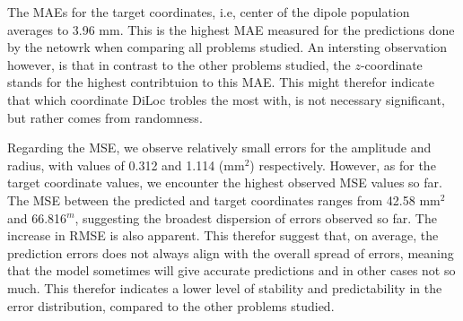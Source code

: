 \documentclass[a4paper, UKenglish, 11pt]{uiomaster}
\begin{document}
The MAEs for the target coordinates, i.e, center of the dipole population averages to 3.96 mm. This is the highest MAE measured for the predictions done by the netowrk when comparing all problems studied. An intersting observation however, is that in contrast to the other problems studied, the $z$-coordinate stands for the highest contribtuion to this MAE. This might therefor indicate that which coordinate DiLoc trobles the most with, is not necessary significant, but rather comes from randomness.

Regarding the MSE, we observe relatively small errors for the amplitude and radius, with values of 0.312 and 1.114 (mm$^2$) respectively. However, as for the target coordinate values, we encounter the highest observed MSE values so far. The MSE between the predicted and target coordinates ranges from 42.58 mm$^2$ and 66.816$^m$, suggesting the broadest dispersion of errors observed so far. The increase in RMSE is also apparent. This therefor suggest that, on average, the prediction errors does not always align with the overall spread of errors, meaning that the model sometimes will give accurate predictions and in other cases not so much. This therefor indicates a lower level of stability and predictability in the error distribution, compared to the other problems studied.
\end{document}
